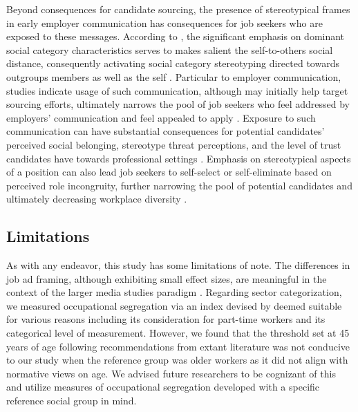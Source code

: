 \documentclass[man]{apa7}
\begin{document}
Beyond consequences for candidate sourcing, the presence of stereotypical frames in early employer communication has consequences for job seekers who are exposed to these messages. According to \Textcite{Yang2015a}, the significant emphasis on dominant social category characteristics serves to makes salient the self-to-others social distance, consequently activating social category stereotyping directed towards outgroups members as well as the self \parencite{Steele1997}. Particular to employer communication, studies indicate usage of such communication, although may initially help target sourcing efforts, ultimately narrows the pool of job seekers who feel addressed by employers’ communication and feel appealed to apply \parencite{zhu_understanding_2021}. Exposure to such communication can have substantial consequences for potential candidates’ perceived social belonging, stereotype threat perceptions, and the level of trust candidates have towards professional settings \parencite{purdie-vaughns_social_2008, walton_question_2007}. Emphasis on stereotypical aspects of a position can also lead job seekers to self-select or self-eliminate based on perceived role incongruity, further narrowing the pool of potential candidates and ultimately decreasing workplace diversity \parencite{henningsen_where_2021}.

\subsection{Limitations}
\label{limitations}
As with any endeavor, this study has some limitations of note. The differences in job ad framing, although exhibiting small effect sizes, are meaningful in the context of the larger media studies paradigm \parencite{Perloff2013}. Regarding sector categorization, we measured occupational segregation via an index devised by \parencite{hakim_segregated_1993} deemed suitable for various reasons including its consideration for part-time workers and its categorical level of measurement. However, we found that the threshold set at 45 years of age following recommendations from extant literature was not conducive to our study when the reference group was older workers as it did not align with normative views on age. We advised future researchers to be cognizant of this and utilize measures of occupational segregation developed with a specific reference social group in mind.
\end{document}

